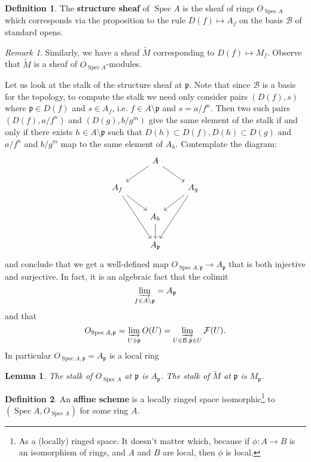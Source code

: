 \documentclass{article}
\newcommand{\fr}{\mathfrak}
\DeclareMathOperator{\Spec}{Spec}
\theoremstyle{plain}
\newtheorem{lem}[thm]{Lemma}
\theoremstyle{definition}
\newtheorem{defn}{Definition}
\theoremstyle{remark}
\newtheorem*{rem}{Remark}
\begin{document}
\begin{defn}
The \textbf{structure sheaf} of $\Spec A$ is the sheaf of rings $O_{\Spec A}$ which corresponds via the proposition to the rule $D(f)\mapsto A_f$ on the basis $\mathcal{B}$ of standard opens.
\end{defn}

\begin{rem}
Similarly, we have a sheaf $\tilde M$ corresponding to $D(f)\mapsto M_f$. Observe that $\tilde M$ is a sheaf of $O_{\Spec A}$-modules.
\end{rem}

Let us look at the stalk of the structure sheaf at $\fr p$. Note that since $\mathcal{B}$ is a basis for the topology, to compute the stalk we need only consider pairs $(D(f),s)$ where $\fr p\in D(f)$ and $s\in A_f$, i.e. $f\in A\setminus\fr p$ and $s=a/f^n$. Then two such pairs $(D(f),a/f^n)$ and $(D(g),b/g^m)$ give the same element of the stalk if and only if there exists $h\in A\setminus \fr p$ such that $D(h)\subset D(f), D(h)\subset D(g)$ and $a/f^n$ and $b/g^m$ map to the same element of $A_h$. Contemplate the diagram:
\begin{equation*}
\begin{tikzcd}
    {}&A\arrow{ld}\arrow{rd}&\\
A_f\arrow{rd}\arrow{rdd} && A_g\arrow{ld}\arrow{ldd}\\
&A_h\arrow{d}&\\
&A_{\fr p}&
\end{tikzcd}
\end{equation*}
and conclude that we get a well-defined map $O_{\Spec A,\fr p}\to A_\fr p$ that is both injective and surjective. In fact, it is an algebraic fact that the colimit
\[\varinjlim_{f\in A\setminus\fr p}=A_\fr p\]
and that
\[O_{\Spec A,\fr p}=\varinjlim_{U\ni\fr p}O(U)=\varinjlim_{U\in\mathcal{B},\fr p\in U}\mathcal{F}(U).\]
In particular $O_{\Spec A,\fr p}=A_\fr p$ is a local ring

\begin{lem}
\label{SL3}
The stalk of $O_{\Spec A}$ at $\fr p$ is $A_\fr p$. The stalk of $\tilde M$ at $\fr p$ is $M_\fr p$.
\end{lem}

\begin{defn}
An \textbf{affine scheme} is a locally ringed space isomorphic\footnote{As a (locally) ringed space. It doesn't matter which, because if $\phi:A\to B$ is an isomorphism of rings, and $A$ and $B$ are local, then $\phi$ is local.} to $(\Spec A,O_{\Spec A})$ for some ring $A$.

\end{defn}
\end{document}
